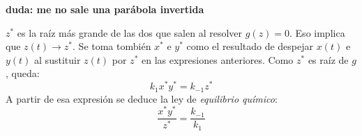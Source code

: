 \textbf{duda: me no sale una parábola invertida}

\begin{center}
\end{center}
$z^*$ es la raíz más grande de las dos que salen al resolver $g(z)=0$. Eso implica que $z(t)\longrightarrow z^*$. Se toma tombién $x^*$ e $y^*$ como el resultado de despejar $x(t)$ e $y(t)$ al sustituir $z(t)$ por $z^*$ en las expresiones anteriores. Como $z^*$ es raíz de $g$, queda:
\[
k_1x^*y^*=k_{-1}z^*
\]
A partir de esa expresión se deduce la ley de \textit{equilibrio químico}:
\[
\frac{x^*y^*}{z^*}=\frac{k_{-1}}{k_1}
\]
